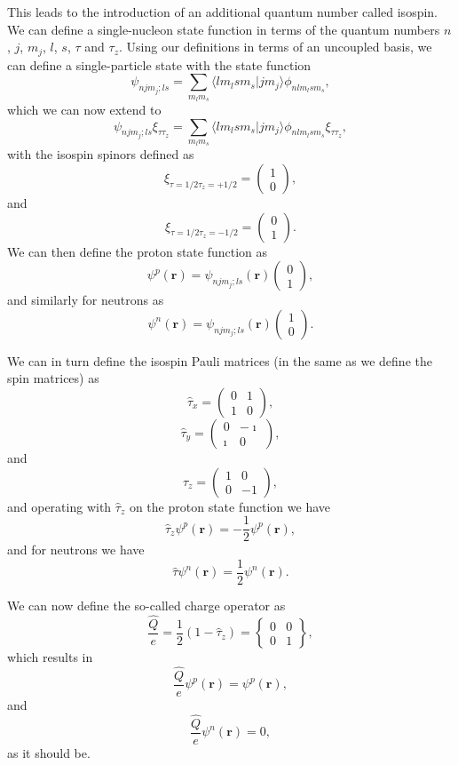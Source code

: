 \documentclass[%
oneside,                 %
final,                   %
10pt]{article}
\begin{document}
This leads to the introduction of an additional quantum number called isospin.
We can define a single-nucleon
state function in terms of the quantum numbers $n$, $j$, $m_j$, $l$, $s$, $\tau$ and $\tau_z$. Using our definitions in terms of an uncoupled basis, we can define a single-particle state with the state function
\[
\psi_{njm_j;ls}=\sum_{m_lm_s}\langle lm_lsm_s|jm_j\rangle\phi_{nlm_lsm_s},
\]
which we can now extend to
\[
\psi_{njm_j;ls}\xi_{\tau\tau_z}=\sum_{m_lm_s}\langle lm_lsm_s|jm_j\rangle\phi_{nlm_lsm_s}\xi_{\tau\tau_z},
\]
with the isospin spinors defined as 
\[
\xi_{\tau=1/2\tau_z=+1/2}=\left(\begin{array}{c} 1  \\ 0\end{array}\right),
\]
and
\[
\xi_{\tau=1/2\tau_z=-1/2}=\left(\begin{array}{c} 0  \\ 1\end{array}\right).
\]
We can then define the proton state function as 
\[
\psi^p(\mathbf{r})  =\psi_{njm_j;ls}(\mathbf{r})\left(\begin{array}{c} 0  \\ 1\end{array}\right), 
\]
and similarly for neutrons as
\[
\psi^n(\mathbf{r})  =\psi_{njm_j;ls}(\mathbf{r})\left(\begin{array}{c} 1  \\ 0\end{array}\right). 
\]

We can in turn define the isospin Pauli matrices (in the same as we define the spin matrices) as
\[
\hat{\tau}_x =\left(\begin{array}{cc} 0 & 1 \\ 1 & 0 \end{array}\right),
\]
\[
\hat{\tau}_y =\left(\begin{array}{cc} 0 & -\imath \\ \imath & 0 \end{array}\right),
\]
and
\[
\hat{\tau}_z =\left(\begin{array}{cc} 1 & 0 \\ 0 & -1 \end{array}\right),
\]
and operating with $\hat{\tau}_z$ on the proton state function we have
\[
\hat{\tau}_z\psi^p(\mathbf{r})=-\frac{1}{2}\psi^p(\mathbf{r}),
\]
and for neutrons we have
\[
\hat{\tau}\psi^n(\mathbf{r})=\frac{1}{2}\psi^n(\mathbf{r}).
\]

We can now define the so-called charge operator as 
\[
\frac{\hat{Q}}{e} = \frac{1}{2}\left(1-\hat{\tau}_z\right)=\begin{Bmatrix} 0 & 0 \\ 0 & 1 \end{Bmatrix},
\]
which results in 
\[
\frac{\hat{Q}}{e}\psi^p(\mathbf{r})=\psi^p(\mathbf{r}),
\]
and
\[
\frac{\hat{Q}}{e}\psi^n(\mathbf{r})=0,
\]
as it should be. 
\end{document}
